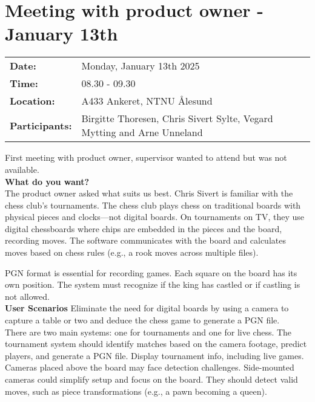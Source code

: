 \section{Meeting with product owner - January 13th}
\begin{tabular}{ll}
    \textbf{Date:} & Monday, January 13th 2025 \\
    \textbf{Time:} & 08.30 - 09.30\\
    \textbf{Location:} & A433 Ankeret, NTNU Ålesund \\
    \textbf{Participants:} & Birgitte Thoresen, Chris Sivert Sylte, Vegard Mytting and Arne Unneland\\
\end{tabular}

\vspace{0.5cm}

First meeting with product owner, supervisor wanted to attend but was not available.\\

\textbf{What do you want?} \\
The product owner asked what suits us best. Chris Sivert is familiar with the chess club's tournaments. The chess club plays chess on traditional boards with physical pieces and clocks—not digital boards. On tournaments on TV, they use digital chessboards where chips are embedded in the pieces and the board, recording moves. The software communicates with the board and calculates moves based on chess rules (e.g., a rook moves across multiple files). 

PGN format is essential for recording games. Each square on the board has its own position. The system must recognize if the king has castled or if castling is not allowed. \\

\textbf{User Scenarios} 
Eliminate the need for digital boards by using a camera to capture a table or two and deduce the chess game to generate a PGN file.\\

There are two main systems: one for tournaments and one for live chess. The tournament system should identify matches based on the camera footage, predict players, and generate a PGN file. Display tournament info, including live games.\\

Cameras placed above the board may face detection challenges. Side-mounted cameras could simplify setup and focus on the board. They should detect valid moves, such as piece transformations (e.g., a pawn becoming a queen). \\

